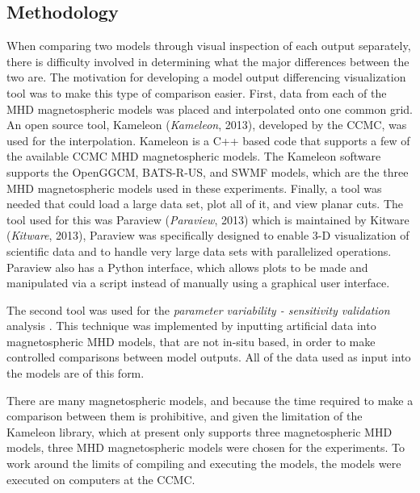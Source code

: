 \subsection{Methodology}
\label{SimilarMethodology}
When comparing two models through visual inspection of each output separately,
there is difficulty involved in determining what the major differences between
the two are. The motivation for developing a model output differencing
visualization tool was to make this type of comparison easier. First, data from
each of the MHD magnetospheric models  was placed and interpolated onto one
common grid. An open source tool, Kameleon (\textit{Kameleon}, 2013), developed by the CCMC, was used for
the interpolation. Kameleon is a C++ based code that
supports a few of the available CCMC MHD magnetospheric models. The Kameleon software supports the OpenGGCM, BATS-R-US, and
SWMF models, which are the three MHD magnetospheric models used in these
experiments. Finally, a tool was needed that could load a large data set, plot
all of it, and view planar cuts. The tool used for this was
Paraview (\textit{Paraview}, 2013) which is maintained by Kitware
(\textit{Kitware}, 2013), Paraview was specifically designed to enable 3-D
visualization of scientific data and to handle very large data sets with
parallelized operations. Paraview also has a Python interface, which
allows plots to be made and manipulated via a script instead of manually using
a graphical user interface.

The second tool was used for the \textit{parameter variability - sensitivity
validation} analysis \citep{Sargent2004}. This technique was implemented by
inputting artificial data into magnetospheric MHD models, that are not in-situ
based, in order to make controlled comparisons between model outputs. All of the
data used as input into the models are of this form.

There are many magnetospheric models, and because the time required to make a
comparison between them is prohibitive, and given the limitation of the
Kameleon library, which at present only supports three magnetospheric MHD
models, three MHD magnetospheric models were chosen for the experiments.
To work around the limits of compiling and executing the models, the
models were executed on computers at the CCMC.

